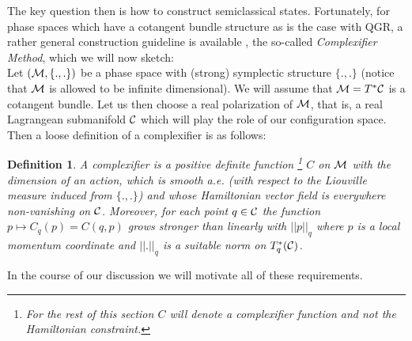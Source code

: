 \documentclass[12pt]{report}
\newtheorem{Definition}{Definition}[section]
\begin{document}
The key question then is how to construct semiclassical states. 
Fortunately, for phase spaces which have a cotangent bundle structure 
as is the case with QGR, a rather general construction guideline is 
available \cite{63}, the so-called {\it Complexifier Method},  
which we will now sketch:\\

Let $({\cal M},\{.,.\})$ be a phase space with (strong) symplectic 
structure $\{.,.\}$ (notice that $\cal M$ is allowed to be infinite 
dimensional). We will assume that ${\cal M}=T^\ast {\cal C}$
is a cotangent bundle. Let us then choose a real polarization of $\cal M$, 
that is, a real Lagrangean submanifold $\cal C$ which will play the role of
our configuration space. Then a loose definition of a complexifier is as 
follows:
%
\begin{Definition} \label{def3.5.2}  
A complexifier is a positive definite function \footnote{For the rest
of this section $C$ will denote a complexifier function and not the 
Hamiltonian constraint.} $C$ on $\cal M$ with the 
dimension of an action, which is smooth
a.e. (with respect to the Liouville measure induced from $\{.,.\}$) and 
whose Hamiltonian vector field is everywhere non-vanishing on $\cal C$.
Moreover, for each point $q\in {\cal C}$ the function $p\mapsto 
C_q(p)=C(q,p)$ grows stronger than linearly with $||p||_q$
where $p$ is a local momentum coordinate and $||.||_q$ is a suitable norm 
on $T^\ast_q({\cal C})$.
\end{Definition}
%
In the course of our discussion we will motivate all of these 
requirements.
\end{document}
